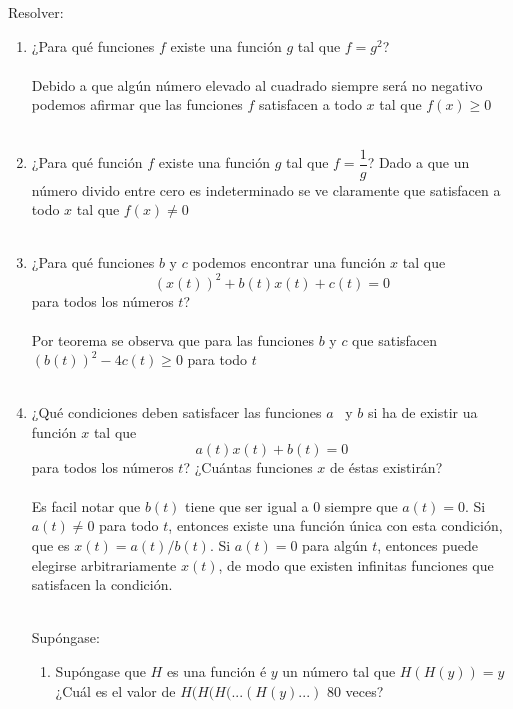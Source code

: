 \begin{ej} Resolver: 
\begin{enumerate}[\bfseries a)]
\item ¿Para qué funciones $f$ existe una función $g$ tal que $f=g^2$?\\\\
Debido a que algún número elevado al cuadrado siempre será no negativo podemos afirmar que las funciones $f$ satisfacen a todo $x$ tal que $f(x)\geq 0$\\\\

\item ¿Para qué función $f$ existe una función $g$ tal que $f=\dfrac{1}{g}$?
Dado a que un número divido entre cero es indeterminado se ve claramente que satisfacen a todo $x$ tal que $f(x)\neq 0$\\\\

\item ¿Para qué funciones $b$ \; y \; $c$ podemos encontrar una función $x$ tal que $$(x(t))^2 + b(t)x(t) + c(t) =0$$ para todos los números $t$?\\\\
Por teorema se observa que para las funciones $b$ \; y \; $c$ que satisfacen $(b(t))^2 - 4c(t) \geq 0$ para todo $t$\\\\ 

\item ¿Qué condiciones deben satisfacer las funciones $a$ \, y \; $b$ si ha de existir ua función $x$ tal que $$a(t)x(t)+ b(t) = 0$$ para todos los números $t$? ¿Cuántas funciones $x$ de éstas existirán?\\\\
Es facil notar que $b(t)$ tiene que ser igual a $0$ siempre que $a(t) = 0$. Si $a(t) \neq 0$ para todo $t$, entonces existe una función única con esta condición, que es $x(t) = a(t)/b(t)$. Si $a(t)=0$ para algún $t$, entonces puede elegirse arbitrariamente $x(t)$, de modo que existen infinitas funciones que satisfacen la condición.\\\\

\begin{ej} Supóngase:
\begin{enumerate}[\bfseries a)]
\item Supóngase que $H$ es una función é \; $y$ \; un número tal que $H(H(y)) = y$ ¿Cuál es el valor de $H(H(H(...(H(y)...)$ 80 veces?\\\\


\end{enumerate}
\end{ej}
\end{enumerate}
\end{ej}
